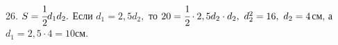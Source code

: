 26. $S=\cfrac{1}{2}d_1d_2.$ Если $d_1=2,5d_2,$ то $20=\cfrac{1}{2}\cdot2,5d_2\cdot d_2,\ d_2^2=16,\ d_2=4$см, а $d_1=2,5\cdot4=10$см.\\

